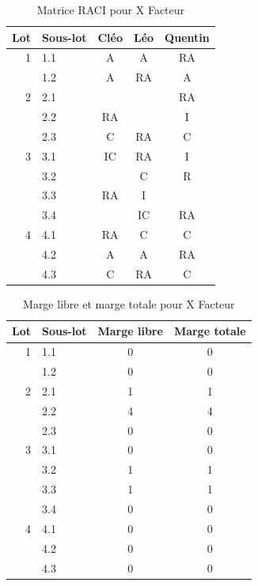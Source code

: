 \documentclass[a4paper, 12pt]{article}
\begin{document}
\begin{table}[h]
\label{tab:raci}
\begin{center}
\begin{tabular}{|r l|c|c|c|}
\hline
\textbf{Lot} & \textbf{Sous-lot} & \textbf{Cléo} & \textbf{Léo} & \textbf{Quentin}\\\hline
1 & 1.1 & A  & A  & RA \\\hline
  & 1.2 & A  & RA & A  \\\hline
2 & 2.1 &    &    & RA \\\hline
  & 2.2 & RA &    & I  \\\hline
  & 2.3 & C  & RA & C  \\\hline
3 & 3.1 & IC & RA & I  \\\hline
  & 3.2 &    & C  & R  \\\hline
  & 3.3 & RA & I  &    \\\hline
  & 3.4 &    & IC & RA \\\hline
4 & 4.1 & RA & C  & C  \\\hline
  & 4.2 & A  & A  & RA \\\hline
  & 4.3 & C  & RA & C  \\\hline
\end{tabular}
\end{center}
\caption{Matrice RACI pour X Facteur}
\end{table}

\begin{table}[h]
\label{tab:marges}
\begin{center}
\begin{tabular}{|r l|c|c|}
\hline
\textbf{Lot} & \textbf{Sous-lot} & \textbf{Marge libre} & \textbf{Marge totale}\\\hline
1 & 1.1 & 0 & 0\\\hline
  & 1.2 & 0 & 0\\\hline
2 & 2.1 & 1 & 1\\\hline
  & 2.2 & 4 & 4\\\hline
  & 2.3 & 0 & 0\\\hline
3 & 3.1 & 0 & 0\\\hline
  & 3.2 & 1 & 1\\\hline
  & 3.3 & 1 & 1\\\hline
  & 3.4 & 0 & 0\\\hline
4 & 4.1 & 0 & 0\\\hline
  & 4.2 & 0 & 0\\\hline
  & 4.3 & 0 & 0\\\hline
\end{tabular}
\end{center}
\caption{Marge libre et marge totale pour X Facteur}
\end{table}
\end{document}
